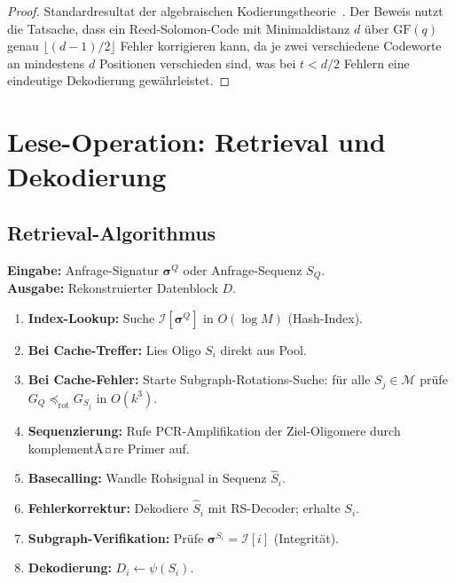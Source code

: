 ﻿\documentclass[a4paper,12pt]{article}
\theoremstyle{definition}
\begin{document}
\begin{proof}
    Standardresultat der algebraischen Kodierungstheorie~\cite{reedsolomon1960}.
    Der Beweis nutzt die Tatsache, dass ein Reed-Solomon-Code mit
    Minimaldistanz $d$ \"{u}ber $\mathrm{GF}(q)$ genau $\lfloor(d-1)/2\rfloor$
    Fehler korrigieren kann, da je zwei verschiedene Codeworte an mindestens
    $d$ Positionen verschieden sind, was bei $t < d/2$ Fehlern eine
    eindeutige Dekodierung gew\"{a}hrleistet. 
\end{proof}

\section{Lese-Operation: Retrieval und Dekodierung}
\label{sec:lesen}

\subsection{Retrieval-Algorithmus}

\textbf{Eingabe:} Anfrage-Signatur $\boldsymbol{\sigma}^Q$ oder
Anfrage-Sequenz $S_Q$.\\
\textbf{Ausgabe:} Rekonstruierter Datenblock $D$.

\begin{enumerate}
    \item \textbf{Index-Lookup:} Suche
          $\mathcal{I}[\boldsymbol{\sigma}^Q]$ in $O(\log M)$
          (Hash-Index).
    \item \textbf{Bei Cache-Treffer:} Lies Oligo $S_i$ direkt aus Pool.
    \item \textbf{Bei Cache-Fehler:} Starte Subgraph-Rotations-Suche:
          f\"{u}r alle $S_j \in \mathcal{M}$ pr\"{u}fe
          $G_Q \preceq_{\mathrm{rot}} G_{S_j}$ in $O(k^3)$.
    \item \textbf{Sequenzierung:} Rufe PCR-Amplifikation der
          Ziel-Oligomere durch komplementÃ¤re Primer auf.
    \item \textbf{Basecalling:} Wandle Rohsignal in Sequenz $\hat{S}_i$.
    \item \textbf{Fehlerkorrektur:} Dekodiere $\hat{S}_i$ mit
          RS-Decoder; erhalte $S_i$.
    \item \textbf{Subgraph-Verifikation:} Pr\"{u}fe
          $\boldsymbol{\sigma}^{S_i} = \mathcal{I}[i]$ (Integrit\"{a}t).
    \item \textbf{Dekodierung:} $D_i \leftarrow \psi(S_i)$.
\end{enumerate}
\end{document}
